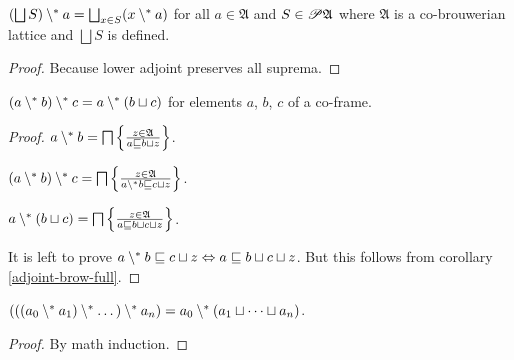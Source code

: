\begin{thm}
\label{cup-pdiff}$\left(\bigsqcup S\right)\setminus^{\ast} a=\bigsqcup_{x\in S}(x\setminus^{\ast} a)$
for all $a\in\mathfrak{A}$ and $S\in\mathscr{P}\mathfrak{A}$ where
$\mathfrak{A}$ is a co-brouwerian lattice and $\bigsqcup S$ is defined.\end{thm}
\begin{proof}
Because lower adjoint preserves all suprema.\end{proof}
\begin{thm}
$(a\setminus^{\ast} b)\setminus^{\ast} c=a\setminus^{\ast}(b\sqcup c)$ for elements
$a$, $b$, $c$ of a co-frame.\end{thm}
\begin{proof}
$a\setminus^{\ast} b=\bigsqcap\left\{ \frac{z\in\mathfrak{A}}{a\sqsubseteq b\sqcup z}\right\}$.

$(a\setminus^{\ast} b)\setminus^{\ast} c=\bigsqcap\left\{ \frac{z\in\mathfrak{A}}{a\setminus^{\ast} b\sqsubseteq c\sqcup z}\right\}$.

$a\setminus^{\ast}(b\sqcup c)=\bigsqcap\left\{ \frac{z\in\mathfrak{A}}{a\sqsubseteq b\sqcup c\sqcup z}\right\}$.

It is left to prove $a\setminus^{\ast} b\sqsubseteq c\sqcup z\Leftrightarrow a\sqsubseteq b\sqcup c\sqcup z$.
But this follows from corollary \ref{adjoint-brow-full}.\end{proof}
\begin{cor}
$(((a_{0}\setminus^{\ast} a_{1})\setminus^{\ast}\dots)\setminus^{\ast} a_{n})=a_{0}\setminus^{\ast}(a_{1}\sqcup\dots\sqcup a_{n})$.\end{cor}
\begin{proof}
By math induction.
\end{proof}

